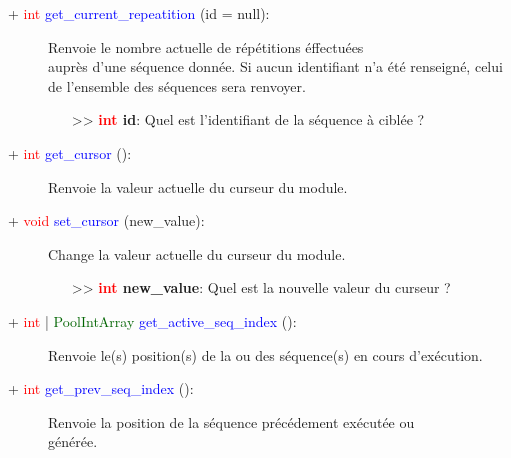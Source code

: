 \documentclass[a4paper, 11pt]{article}
\begin{document}
	\begin{description}
		\item [+ \textcolor{red}{int} \textcolor{blue}{get\_current\_repeatition} (id = null):] Renvoie le 
		nombre actuelle de répétitions éffectuées \\auprès d'une séquence donnée. Si aucun identifiant n'a 
		été renseigné, celui de l'ensemble des séquences sera renvoyer.
		\begin{itemize}
			\item [>> \textbf{\textcolor{red}{int} id}:] Quel est l'identifiant de la séquence à ciblée ?\\
		\end{itemize}
	\end{description}
	\begin{description}
		\item [+ \textcolor{red}{int} \textcolor{blue}{get\_cursor} ():] Renvoie la valeur actuelle du 
		curseur du module.\\
	\end{description}
	\begin{description}
		\item [+ \textcolor{red}{void} \textcolor{blue}{set\_cursor} (new\_value):] Change la valeur 
		actuelle du curseur du module.
		\begin{itemize}
			\item [>> \textbf{\textcolor{red}{int} new\_value}:] Quel est la nouvelle valeur du curseur ?\\
		\end{itemize}
	\end{description}
	\begin{description}
		\item [+ \textcolor{red}{int} | \textcolor{darkgreen}{PoolIntArray} \textcolor{blue}
		{get\_active\_seq\_index} ():] Renvoie le(s) position(s) de la ou des séquence(s) en cours 
		d'exécution.\\
	\end{description}
	\begin{description}
		\item [+ \textcolor{red}{int} \textcolor{blue}{get\_prev\_seq\_index} ():] Renvoie la position de 
		la séquence précédement exécutée ou \\générée.\\
	\end{description}
\end{document}
